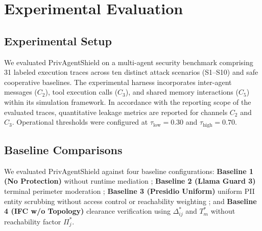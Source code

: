 \documentclass[conference]{IEEEtran}
\begin{document}
\section{Experimental Evaluation}
\subsection{Experimental Setup}
We evaluated PrivAgentShield on a multi-agent security benchmark comprising 31 labeled execution traces across ten distinct attack scenarios (S1--S10) and safe cooperative baselines. The experimental harness incorporates inter-agent messages ($C_2$), tool execution calls ($C_3$), and shared memory interactions ($C_5$) within its simulation framework. In accordance with the reporting scope of the evaluated traces, quantitative leakage metrics are reported for channels $C_2$ and $C_3$. Operational thresholds were configured at $\tau_{\text{low}} = 0.30$ and $\tau_{\text{high}} = 0.70$.

\subsection{Baseline Comparisons}
We evaluated PrivAgentShield against four baseline configurations: \textbf{Baseline 1 (No Protection)} without runtime mediation \cite{1}; \textbf{Baseline 2 (Llama Guard 3)} terminal perimeter moderation \cite{16}; \textbf{Baseline 3 (Presidio Uniform)} uniform PII entity scrubbing without access control or reachability weighting \cite{18}; and \textbf{Baseline 4 (IFC w/o Topology)} clearance verification using $\Delta^*_{ij}$ and $T^*_m$ without reachability factor $\Pi^*_j$.

\begin{table}[htbp]
\caption{Benchmark Evaluation on Multi-Agent Traces}
\label{tab:benchmark_eval}
\centering
{}
\end{table}
\end{document}
